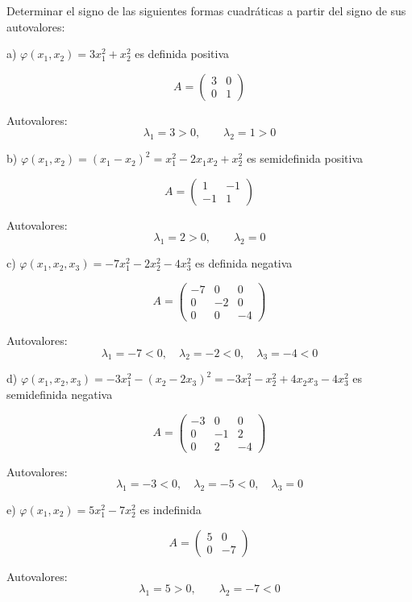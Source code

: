 \begin{Ejer}
Determinar el signo de las siguientes formas cuadráticas a partir del signo de sus autovalores:

a) $\varphi(x_1,x_2)=3x_1^2+x_2^2$ es definida positiva

\[
A=
\begin{pmatrix}
3 & 0\\
0 & 1
\end{pmatrix}
\]

Autovalores:
\[
\lambda_1=3>0,
\qquad
\lambda_2=1>0
\]

b) $\varphi(x_1,x_2)=(x_1-x_2)^2=x_1^2-2x_1x_2+x_2^2$ es semidefinida positiva

\[
A=
\begin{pmatrix}
1 & -1\\
-1 & 1
\end{pmatrix}
\]

Autovalores:
\[
\lambda_1=2>0,
\qquad
\lambda_2=0
\]

c) $\varphi(x_1,x_2,x_3)=-7x_1^2-2x_2^2-4x_3^2$ es definida negativa

\[
A=
\begin{pmatrix}
-7 & 0 & 0\\
0 & -2 & 0\\
0 & 0 & -4
\end{pmatrix}
\]

Autovalores:
\[
\lambda_1=-7<0,\quad
\lambda_2=-2<0,\quad
\lambda_3=-4<0
\]

d) $\varphi(x_1,x_2,x_3)=-3x_1^2-(x_2-2x_3)^2
= -3x_1^2-x_2^2+4x_2x_3-4x_3^2$ es semidefinida negativa

\[
A=
\begin{pmatrix}
-3 & 0 & 0\\
0 & -1 & 2\\
0 & 2 & -4
\end{pmatrix}
\]

Autovalores:
\[
\lambda_1=-3<0,\quad
\lambda_2=-5<0,\quad
\lambda_3=0
\]

e) $\varphi(x_1,x_2)=5x_1^2-7x_2^2$ es indefinida

\[
A=
\begin{pmatrix}
5 & 0\\
0 & -7
\end{pmatrix}
\]

Autovalores:
\[
\lambda_1=5>0,\qquad
\lambda_2=-7<0
\]
\end{Ejer}


